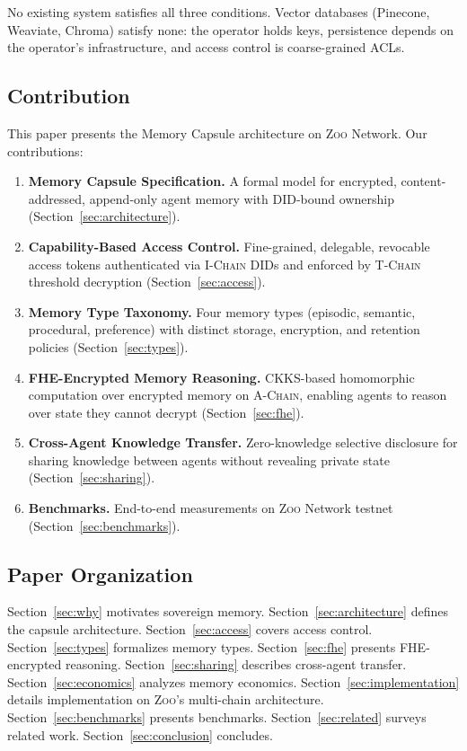 \documentclass[11pt,letterpaper]{article}
\theoremstyle{definition}
\theoremstyle{remark}
\newcommand{\Zoo}{\textsc{Zoo}}
\newcommand{\AChain}{\textsc{A-Chain}}
\newcommand{\IChain}{\textsc{I-Chain}}
\newcommand{\TChain}{\textsc{T-Chain}}
\newcommand{\CKKS}{\textsc{CKKS}}
\newcommand{\DID}{\textsc{DID}}
\begin{document}
No existing system satisfies all three conditions. Vector databases (Pinecone, Weaviate, Chroma) satisfy none: the operator holds keys, persistence depends on the operator's infrastructure, and access control is coarse-grained ACLs.

\subsection{Contribution}

This paper presents the Memory Capsule architecture on \Zoo{} Network. Our contributions:

\begin{enumerate}
    \item \textbf{Memory Capsule Specification.} A formal model for encrypted, content-addressed, append-only agent memory with \DID{}-bound ownership (Section~\ref{sec:architecture}).
    \item \textbf{Capability-Based Access Control.} Fine-grained, delegable, revocable access tokens authenticated via \IChain{} \DID{}s and enforced by \TChain{} threshold decryption (Section~\ref{sec:access}).
    \item \textbf{Memory Type Taxonomy.} Four memory types (episodic, semantic, procedural, preference) with distinct storage, encryption, and retention policies (Section~\ref{sec:types}).
    \item \textbf{FHE-Encrypted Memory Reasoning.} \CKKS{}-based homomorphic computation over encrypted memory on \AChain{}, enabling agents to reason over state they cannot decrypt (Section~\ref{sec:fhe}).
    \item \textbf{Cross-Agent Knowledge Transfer.} Zero-knowledge selective disclosure for sharing knowledge between agents without revealing private state (Section~\ref{sec:sharing}).
    \item \textbf{Benchmarks.} End-to-end measurements on \Zoo{} Network testnet (Section~\ref{sec:benchmarks}).
\end{enumerate}

\subsection{Paper Organization}

Section~\ref{sec:why} motivates sovereign memory. Section~\ref{sec:architecture} defines the capsule architecture. Section~\ref{sec:access} covers access control. Section~\ref{sec:types} formalizes memory types. Section~\ref{sec:fhe} presents FHE-encrypted reasoning. Section~\ref{sec:sharing} describes cross-agent transfer. Section~\ref{sec:economics} analyzes memory economics. Section~\ref{sec:implementation} details implementation on \Zoo{}'s multi-chain architecture. Section~\ref{sec:benchmarks} presents benchmarks. Section~\ref{sec:related} surveys related work. Section~\ref{sec:conclusion} concludes.
\end{document}
